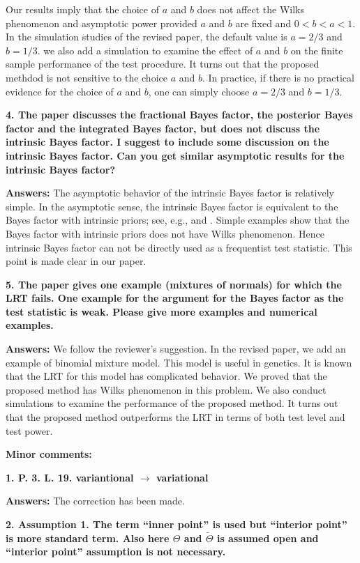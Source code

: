 \documentclass[11pt]{article}
\theoremstyle{plain}
\theoremstyle{definition}
\theoremstyle{remark}
\begin{document}
Our results imply that the choice of $a$ and $b$ does not affect the Wilks phenomenon and asymptotic power provided $a$ and $b$ are fixed and $0<b<a<1$.
In the simulation studies of the revised paper, the default value is $a=2/3$ and $b= 1/3$.
we also add a simulation to examine the effect of $a$ and $b$ on the finite sample performance of the test procedure.
It turns out that the proposed methdod is not sensitive to the choice $a$ and $b$.
In practice, if there is no practical evidence for the choice of $a$ and $b$, one can simply choose $a = 2/3$ and $b = 1/3$.

\textbf{
    4. The paper discusses the fractional Bayes factor, the posterior Bayes factor and the integrated Bayes factor, but does not discuss the intrinsic Bayes factor. I suggest to include some discussion on the intrinsic Bayes factor. Can you get similar asymptotic results for the intrinsic Bayes factor?
}

\textbf{Answers:}
The asymptotic behavior of the intrinsic Bayes factor is relatively simple.
In the asymptotic sense, the intrinsic Bayes factor is equivalent to the Bayes factor with intrinsic priors; see, e.g., \cite{intrisicBayesFactor} and \cite{Moreno1998An}.
Simple examples show that the Bayes factor with intrinsic  priors does not have Wilks phenomenon.
Hence intrinsic Bayes factor can not be directly used as a frequentist test statistic.
This point is made clear in our paper.

\textbf{
    5. The paper gives one example (mixtures of normals) for which the LRT fails. One example for the argument for the Bayes factor as the test statistic is weak. Please give more examples and numerical examples.
}

\textbf{Answers:}
We follow the reviewer's suggestion.
In the revised paper, we add an example of binomial mixture model.
This model is useful in genetics.
It is known that the LRT for this model has complicated behavior.
We proved that the proposed method has Wilks phenomenon in this problem.
We also conduct simulations to examine the performance of the proposed method.
It turns out that the proposed method outperforms the LRT in terms of both test level and test power.

\textbf{Minor comments:}

\textbf{
1. 
P. 3. L. 19. variantional $\rightarrow$ variational
}

\textbf{Answers:}
The correction has been made.

\textbf{
2. Assumption 1. The term ``inner point'' is used but ``interior point'' is more standard term.
Also here $\Theta$ and $\tilde \Theta$ is assumed open and ``interior point'' assumption is not necessary.
}
\end{document}

